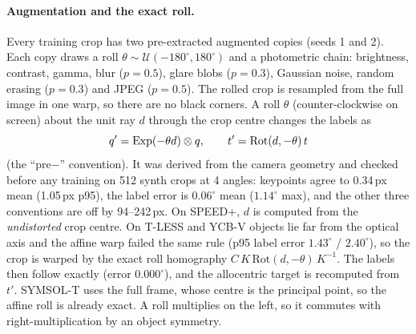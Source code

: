 \paragraph{Augmentation and the exact roll.}
Every training crop has two pre-extracted augmented copies (seeds 1 and 2). Each copy draws a roll $\theta\sim\mathcal{U}(-180^\circ,180^\circ)$ and a photometric chain: brightness, contrast, gamma, blur ($p=0.5$), glare blobs ($p=0.3$), Gaussian noise, random erasing ($p=0.3$) and JPEG ($p=0.5$). The rolled crop is resampled from the full image in one warp, so there are no black corners. A roll $\theta$ (counter-clockwise on screen) about the unit ray $d$ through the crop centre changes the labels as
\begin{equation}
  q'=\mathrm{Exp}(-\theta d)\otimes q,\qquad t'=\mathrm{Rot}(d,-\theta)\,t
\end{equation}
(the ``pre$-$'' convention). It was derived from the camera geometry and checked before any training on 512 synth crops at 4 angles: keypoints agree to 0.34\,px mean (1.05\,px p95), the label error is $0.06^\circ$ mean ($1.14^\circ$ max), and the other three conventions are off by 94--242\,px. On SPEED+, $d$ is computed from the \emph{undistorted} crop centre. On T-LESS and YCB-V objects lie far from the optical axis and the affine warp failed the same rule (p95 label error $1.43^\circ$ / $2.40^\circ$), so the crop is warped by the exact roll homography $C\,K\,\mathrm{Rot}(d,-\theta)\,K^{-1}$. The labels then follow exactly (error $0.000^\circ$), and the allocentric target is recomputed from $t'$. SYMSOL-T uses the full frame, whose centre is the principal point, so the affine roll is already exact. A roll multiplies on the left, so it commutes with right-multiplication by an object symmetry.

